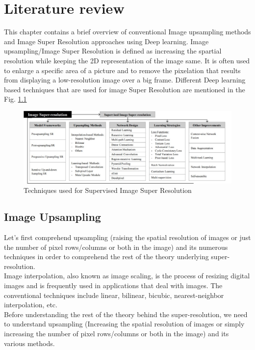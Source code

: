%
\chapter{Literature review}
This chapter contains a brief overview of conventional Image upsampling methods and Image Super Resolution approaches using Deep learning.
Image upsampling/Image Super Resolution is defined as increasing the spartial resolution while keeping the 2D representation of the image same. It is often used to enlarge a specific area of a picture and to remove the pixelation that results from displaying a low-resolution image over a big frame. Different  Deep learning based techniques that are used for image Super Resolution are mentioned in the Fig. \ref{fig:label2.1}
\begin{figure}[h]
    \centering
    \includegraphics[totalheight=2in]{Chapter2/DLSR.jpeg}
    \caption[Techniques used for Supervised Image Super Resolution]{Techniques used for Supervised Image Super Resolution \cite{DLSR}}
    \label{fig:label2.1}
\end{figure}

\section{Image Upsampling}
Let's first comprehend upsampling (raising the spatial resolution of images or just the number of pixel rows/columns or both in the image) and its numerous techniques in order to comprehend the rest of the theory underlying super-resolution.\\
Image interpolation, also known as image scaling, is the process of resizing digital images and is frequently used in applications that deal with images. The conventional techniques include linear, bilinear, bicubic, nearest-neighbor interpolation, etc.\\
Before understanding the rest of the theory behind the super-resolution, we need to understand upsampling (Increasing the spatial resolution of images or simply increasing the number of pixel rows/columns or both in the image) and its various methods.\\

